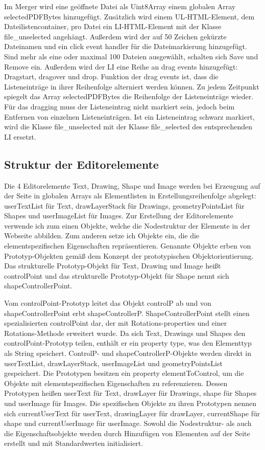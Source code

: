 Im Merger wird eine geöffnete Datei als Uint8Array einem globalen Array selectedPDFBytes hinzugefügt. Zusätzlich wird einem UL-HTML-Element, dem Dateilistencontainer, pro Datei ein LI-HTML-Element mit der Klasse file\_unselected angehängt. Außerdem wird der auf 50 Zeichen gekürzte Dateinamen und ein click event handler für die Dateimarkierung hinzugefügt. Sind mehr als eine oder maximal 100 Dateien ausgewählt, schalten sich Save und Remove ein. Außerdem wird der LI eine Reihe an drag events hinzugefügt: Dragstart, dragover und drop. Funktion der drag events ist, dass die Listeneinträge in ihrer Reihenfolge alterniert werden können. Zu jedem Zeitpunkt spiegelt das Array selectedPDFBytes die Reihenfolge der Listeneinträge wieder. Für das dragging muss der Listeneintrag nicht markiert sein, jedoch beim Entfernen von einzelnen Listeneinträgen. Ist ein Listeneintrag schwarz markiert, wird die Klasse file\_unselected mit der Klasse file\_selected des entsprechenden LI ersetzt.

\subsection{Struktur der Editorelemente}
Die 4 Editorelemente Text, Drawing, Shape und Image werden bei Erzeugung auf der Seite in globalen Arrays als Elementlisten in Erstellungsreihenfolge abgelegt: userTextList für Text, drawLayerStack für Drawings, geometryPointsList für Shapes und userImageList für Images. Zur Erstellung der Editorelemente verwende ich zum einen Objekte, welche die Nodestruktur der Elemente in der Webseite abbilden. Zum anderen setze ich Objekte ein, die die elementspezifischen Eigenschaften repräsentieren. Genannte Objekte erben von Prototyp-Objekten gemäß dem Konzept der prototypischen Objektorientierung. Das strukturelle Prototyp-Objekt für Text, Drawing und Image heißt controlPoint und das strukturelle Prototyp-Objekt für Shape nennt sich shapeControllerPoint.
\par
Vom controlPoint-Prototyp leitet das Objekt controlP ab und von shapeControllerPoint erbt shapeControllerP. ShapeControllerPoint stellt einen spezialisierten controlPoint dar, der mit Rotations-properties und einer Rotations-Methode erweitert wurde. Da sich Text, Drawings und Shapes den controlPoint-Prototyp teilen, enthält er ein property type, was den Elementtyp als String speichert. ControlP- und shapeControllerP-Objekte werden direkt in userTextList, drawLayerStack, userImageList und geometryPointsList gespeichert. Die Prototypen besitzen ein property elementToControl, um die Objekte mit elementspezifischen Eigenschaften zu referenzieren. Dessen Prototypen heißen userText für Text, drawLayer für Drawings, shape für Shapes und userImage für Images. Die spezifischen Objekte zu ihren Prototypen nennen sich currentUserText für userText, drawingLayer für drawLayer, currentShape für shape und currentUserImage für userImage. Sowohl die Nodestruktur- als auch die Eigenschaftsobjekte werden durch Hinzufügen von Elementen auf der Seite erstellt und mit Standardwerten initialisiert. 

